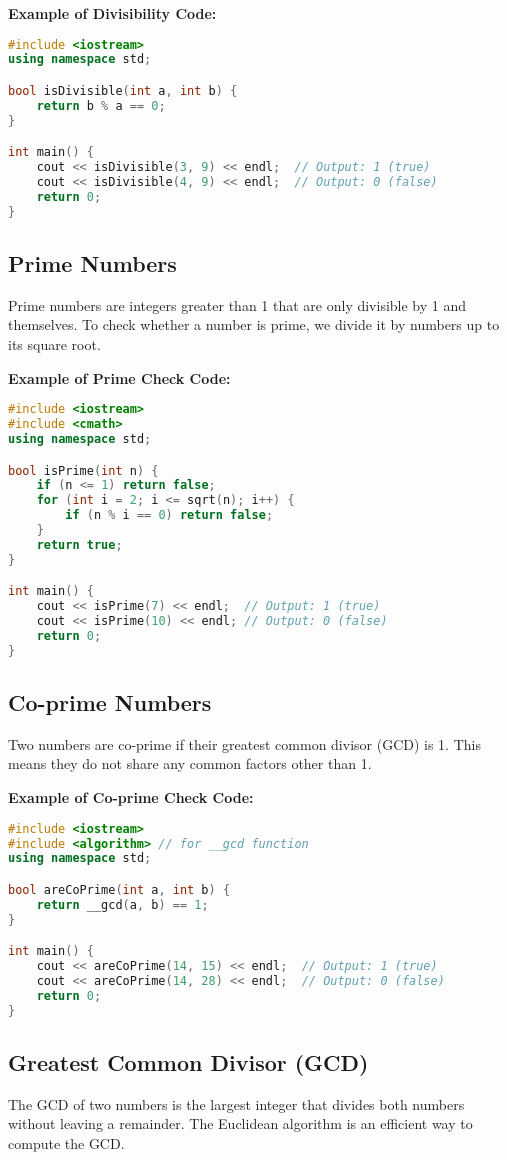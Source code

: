 \documentclass[10pt,a4paper]{article}
\begin{document}
\textbf{Example of Divisibility Code:}
\begin{lstlisting}[language=C++]
#include <iostream>
using namespace std;

bool isDivisible(int a, int b) {
    return b % a == 0;
}

int main() {
    cout << isDivisible(3, 9) << endl;  // Output: 1 (true)
    cout << isDivisible(4, 9) << endl;  // Output: 0 (false)
    return 0;
}
\end{lstlisting}

\subsection*{Prime Numbers}
Prime numbers are integers greater than 1 that are only divisible by 1 and themselves. To check whether a number is prime, we divide it by numbers up to its square root. 

\textbf{Example of Prime Check Code:}
\begin{lstlisting}[language=C++]
#include <iostream>
#include <cmath>
using namespace std;

bool isPrime(int n) {
    if (n <= 1) return false;
    for (int i = 2; i <= sqrt(n); i++) {
        if (n % i == 0) return false;
    }
    return true;
}

int main() {
    cout << isPrime(7) << endl;  // Output: 1 (true)
    cout << isPrime(10) << endl; // Output: 0 (false)
    return 0;
}
\end{lstlisting}

\subsection*{Co-prime Numbers}
Two numbers are co-prime if their greatest common divisor (GCD) is 1. This means they do not share any common factors other than 1. 

\textbf{Example of Co-prime Check Code:}
\begin{lstlisting}[language=C++]
#include <iostream>
#include <algorithm> // for __gcd function
using namespace std;

bool areCoPrime(int a, int b) {
    return __gcd(a, b) == 1;
}

int main() {
    cout << areCoPrime(14, 15) << endl;  // Output: 1 (true)
    cout << areCoPrime(14, 28) << endl;  // Output: 0 (false)
    return 0;
}
\end{lstlisting}

\subsection*{Greatest Common Divisor (GCD)}
The GCD of two numbers is the largest integer that divides both numbers without leaving a remainder. The Euclidean algorithm is an efficient way to compute the GCD.
\end{document}
